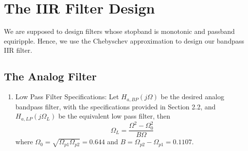 \documentclass{article}
\begin{document}
\section{The IIR Filter Design}
We are supposed to design filters whose stopband is monotonic and passband equiripple.  
Hence, we use the Chebyschev approximation to design our bandpass IIR filter.
\subsection{The Analog Filter}
\begin{enumerate}

\item {Low Pass Filter Specifications:}  Let $H_{a, BP}(j\Omega)$ be the desired analog bandpass filter,  with the specifications provided in Section 2.2, and $H_{a,LP}(j\Omega_L)$ be the equivalent low pass filter, then
\begin{equation}
\Omega_L = \frac{\Omega^2 - \Omega_0^2}{B\Omega} \label{eq:freq_transform}
\end{equation}
where $\Omega_0 = \sqrt{\Omega_{p1}\Omega_{p2}} = 0.644$ and $B = \Omega_{p2} - \Omega_{p1} = 0.1107$.


\end{enumerate}
\end{document}
